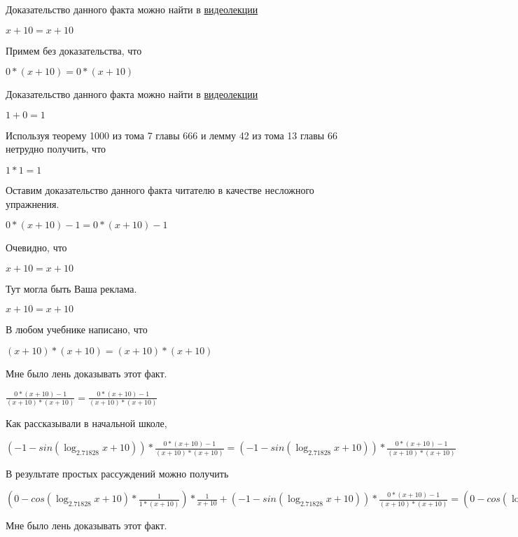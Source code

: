 \documentclass[12pt,a4paper,fleqn]{article}
\theoremstyle{definition}
\begin{document}
Доказательство данного факта можно найти в \href{https://www.youtube.com/watch?v=dQw4w9WgXcQ}{видеолекции} 

$ x  +  10  =  x  +  10 $

Примем без доказательства, что 

$ 0  * ( x  +  10 ) =  0  * ( x  +  10 )$

Доказательство данного факта можно найти в \href{https://www.youtube.com/watch?v=dQw4w9WgXcQ}{видеолекции} 

$ 1  +  0  =  1 $

Используя теорему 1000 из тома 7 главы 666 и лемму 42 из тома 13 главы 66 нетрудно получить, что 

$ 1  *  1  =  1 $

Оставим доказательство данного факта читателю в качестве несложного упражнения. 

$ 0  * ( x  +  10 ) -  1  =  0  * ( x  +  10 ) -  1 $

Очевидно, что 

$ x  +  10  =  x  +  10 $

Тут могла быть Ваша реклама. 

$ x  +  10  =  x  +  10 $

В любом учебнике написано, что 

$( x  +  10 ) * ( x  +  10 ) = ( x  +  10 ) * ( x  +  10 )$

Мне было лень доказывать этот факт.

$\frac{ 0  * ( x  +  10 ) -  1 }{( x  +  10 ) * ( x  +  10 )}
 = \frac{ 0  * ( x  +  10 ) -  1 }{( x  +  10 ) * ( x  +  10 )}
$

Как рассказывали в начальной школе, 

$( -1  - sin(\log_{ 2.71828 }{ x  +  10 })) * \frac{ 0  * ( x  +  10 ) -  1 }{( x  +  10 ) * ( x  +  10 )}
 = ( -1  - sin(\log_{ 2.71828 }{ x  +  10 })) * \frac{ 0  * ( x  +  10 ) -  1 }{( x  +  10 ) * ( x  +  10 )}
$

В результате простых рассуждений можно получить 

$( 0  - cos(\log_{ 2.71828 }{ x  +  10 }) * \frac{ 1 }{ 1  * ( x  +  10 )}
) * \frac{ 1 }{ x  +  10 }
 + ( -1  - sin(\log_{ 2.71828 }{ x  +  10 })) * \frac{ 0  * ( x  +  10 ) -  1 }{( x  +  10 ) * ( x  +  10 )}
 = ( 0  - cos(\log_{ 2.71828 }{ x  +  10 }) * \frac{ 1 }{ 1  * ( x  +  10 )}
) * \frac{ 1 }{ x  +  10 }
 + ( -1  - sin(\log_{ 2.71828 }{ x  +  10 })) * \frac{ 0  * ( x  +  10 ) -  1 }{( x  +  10 ) * ( x  +  10 )}
$

Мне было лень доказывать этот факт.
\end{document}
